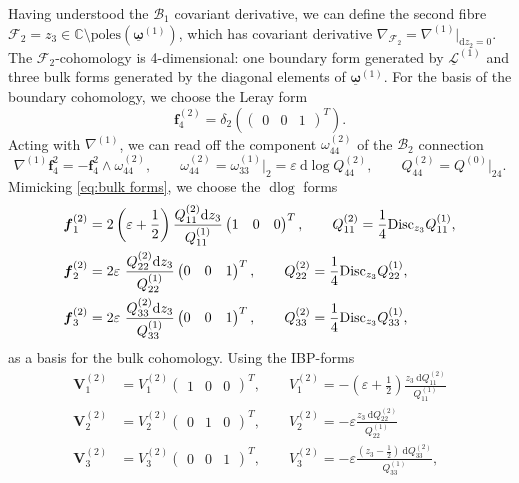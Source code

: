 \documentclass[11pt]{article}
\renewcommand{\d}{\text{d}}
\newcommand{\be}{\begin{equation}}
\newcommand{\ee}{\end{equation}}
\newcommand{\F}{\mathcal{F}}
\renewcommand{\L}{\mathcal{L}}
\newcommand{\B}{\mathcal{B}}
\newcommand{\vep}{\varepsilon}
\newcommand{\disc}{{\rm Disc}}
\newcommand{\bs}[1]{\boldsymbol{#1}}
\newcommand{\mat}[1]{\underline{\boldsymbol{#1}}}
\begin{document}
Having understood the $\B_1$ covariant derivative, we can define the second fibre $\F_{2} = z_3 \in \mathbb{C} \setminus \text{poles}(\mat{\omega}^{(1)})$, which has covariant derivative $\nabla_{\F_2} = \nabla^{(1)}\vert_{\d z_2=0}$. The $\F_2$-cohomology is 4-dimensional: one boundary form generated by $\mat{\L}^{(1)}$ and three bulk forms generated by the diagonal elements of $\mat{\omega}^{(1)}$. For the basis of the boundary cohomology, we choose the Leray form
\be
	\bs{f}^{(2)}_4 =  \delta_2\left(\begin{pmatrix}0&0&1\end{pmatrix}^T\right). 
\ee
Acting with $\nabla^{(1)}$, we can read off the component $\omega^{(2)}_{44}$ of the $\B_2$ connection
\be
	\nabla^{(1)} \bs{f}^{2}_4 = - \bs{f}^{2}_4 \wedge \omega^{(2)}_{44},
	\qquad 
	\omega^{(2)}_{44} = \omega^{(1)}_{33}\vert_2 = \vep\ \d\log Q^{(2)}_{44},
	\qquad 
	Q^{(2)}_{44} = Q^{(0)}\vert_{24}.
\ee
Mimicking \eqref{eq:bulk forms}, we choose the $\d\log$ forms
\begin{align}
	\bs{f}^{(2)}_1 &= 2\left(\vep+\frac12\right) \frac{Q^{(2)}_{11} \d z_3}{Q^{(1)}_{11}} 
		\begin{pmatrix}1&0&0\end{pmatrix}^T,
	\qquad 
	Q^{(2)}_{11} = \frac14 \disc_{z_3}Q^{(1)}_{11},
	\\
	\bs{f}^{(2)}_2 &=  2\vep\ \frac{Q^{(2)}_{22} \d z_3}{Q^{(1)}_{22}}
		\begin{pmatrix}0&0&1\end{pmatrix}^T,
	\qquad 
	Q^{(2)}_{22} = \frac14 \disc_{z_3}Q^{(1)}_{22},
	\\
	\bs{f}^{(2)}_3 &=  2\vep\ \frac{Q^{(2)}_{33} \d z_3}{Q^{(1)}_{33}} 
		\begin{pmatrix}0&0&1\end{pmatrix}^T,
	\qquad 
	Q^{(2)}_{33} = \frac14 \disc_{z_3}Q^{(1)}_{33},
\end{align}
as a basis for the bulk cohomology. Using the IBP-forms 
\begin{align}
	\bs{V}^{(2)}_1 &= V^{(2)}_1 \begin{pmatrix}1&0&0\end{pmatrix}^T,
	\qquad
	V^{(2)}_1 = - \left(\vep+\frac12\right) 
		\frac{z_3\ \d Q^{(2)}_{11}}{Q^{(1)}_{11}}
	\\
	\bs{V}^{(2)}_2 &= V^{(2)}_2 \begin{pmatrix}0&1&0\end{pmatrix}^T,
	\qquad 
	V^{(2)}_2 = - \vep \frac{z_3\ \d Q^{(2)}_{22}}{Q^{(1)}_{22}}
	\\
	\bs{V}^{(2)}_3 &= V^{(2)}_3 \begin{pmatrix}0&0&1\end{pmatrix}^T,
	\qquad V^{(2)}_3 = - \vep \frac{(z_3{-}\frac12)\ \d Q^{(2)}_{33}}{Q^{(1)}_{33}},
\end{align}
\end{document}
